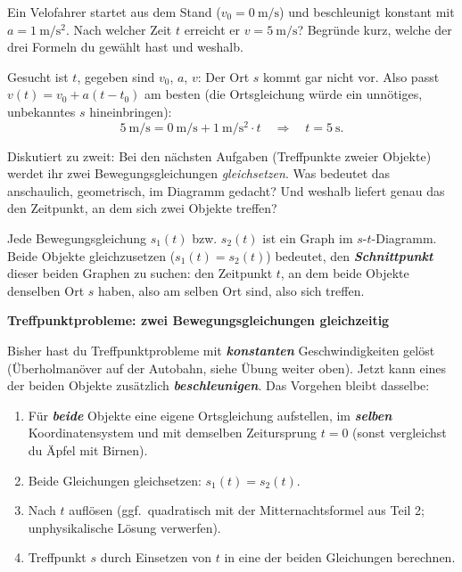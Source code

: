 \documentclass[addpoints,11pt,a4paper]{exam}
\newenvironment{theoriebox}[1][Theorie]{%
  \par\addvspace{10pt}\noindent\textbf{#1}\par\smallskip\noindent
}{%
  \par\addvspace{10pt}
}
\newlength{\antwortraumlen}
\newcommand{\Antwortraum}[1]{%
  \pgfmathsetlength{\antwortraumlen}{#1*2.5cm}%
  \begin{answerbox}
    \rule{0pt}{\antwortraumlen}%
  \end{answerbox}%
}
\begin{document}
\begin{questions}
\begin{taskbox}
\question[3] Ein Velofahrer startet aus dem Stand ($v_0=\SI{0}{\meter\per\second}$)
und beschleunigt konstant mit $a=\SI{1}{\meter\per\second\squared}$.
Nach welcher Zeit $t$ erreicht er $v=\SI{5}{\meter\per\second}$? Begründe
kurz, welche der drei Formeln du gewählt hast und weshalb.
\Antwortraum{3}
\begin{solution}
Gesucht ist $t$, gegeben sind $v_0$, $a$, $v$: Der Ort $s$ kommt gar
nicht vor. Also passt $v(t)=v_0+a(t-t_0)$ am besten (die Ortsgleichung
würde ein unnötiges, unbekanntes $s$ hineinbringen):
\[
  \SI{5}{\meter\per\second} = \SI{0}{\meter\per\second} + \SI{1}{\meter\per\second\squared}\cdot t
  \quad\Longrightarrow\quad t = \SI{5}{\second}.
\]
\end{solution}
\end{taskbox}
\end{questions}

\begin{questions}
\begin{groupbox}
\question[3] Diskutiert zu zweit: Bei den nächsten Aufgaben (Treffpunkte
zweier Objekte) werdet ihr zwei Bewegungsgleichungen \emph{gleichsetzen}.
Was bedeutet das anschaulich, geometrisch, im Diagramm gedacht? Und
weshalb liefert genau das den Zeitpunkt, an dem sich zwei Objekte
treffen?
\Antwortraum{3}
\begin{solution}
Jede Bewegungsgleichung $s_1(t)$ bzw. $s_2(t)$ ist ein Graph im
$s$-$t$-Diagramm. Beide Objekte gleichzusetzen ($s_1(t)=s_2(t)$) bedeutet,
den \textbf{\emph{Schnittpunkt}} dieser beiden Graphen zu suchen: den
Zeitpunkt $t$, an dem beide Objekte denselben Ort $s$ haben, also am
selben Ort sind, also sich treffen.
\end{solution}
\end{groupbox}
\end{questions}

\begin{theoriebox}[Treffpunktprobleme: zwei Bewegungsgleichungen gleichzeitig]
Bisher hast du Treffpunktprobleme mit \textbf{\emph{konstanten}}
Geschwindigkeiten gelöst (Überholmanöver auf der Autobahn, siehe Übung
weiter oben). Jetzt kann eines der beiden Objekte zusätzlich
\textbf{\emph{beschleunigen}}.
Das Vorgehen bleibt dasselbe:
\begin{enumerate}[leftmargin=1.2cm,itemsep=0.25em]
  \item Für \textbf{\emph{beide}} Objekte eine eigene Ortsgleichung
  aufstellen, im \textbf{\emph{selben}} Koordinatensystem und mit
  demselben Zeitursprung $t=0$ (sonst vergleichst du Äpfel mit Birnen).
  \item Beide Gleichungen gleichsetzen: $s_1(t)=s_2(t)$.
  \item Nach $t$ auflösen (ggf.\ quadratisch mit der Mitternachtsformel
  aus Teil 2; unphysikalische Lösung verwerfen).
  \item Treffpunkt $s$ durch Einsetzen von $t$ in eine der beiden
  Gleichungen berechnen.
\end{enumerate}
\end{theoriebox}
\end{document}
